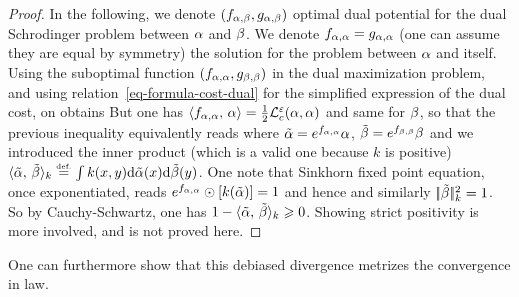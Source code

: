 \begin{proof}	
	In the following, we denote $(f_{\alpha,\beta},g_{\alpha,\beta})$ optimal dual potential for the 
	dual Schrodinger problem between $\alpha$ and $\beta$.
	We denote $f_{\alpha,\alpha}=g_{\alpha,\alpha}$ (one can assume they are equal by symmetry) the solution for the problem between $\alpha$ and itself. 
	Using the suboptimal function $(f_{\alpha,\alpha},g_{\beta,\beta})$ in the dual maximization problem, and using relation~\eqref{eq-formula-cost-dual} for the simplified expression of the dual cost, on obtains
	But one has $\langle f_{\alpha,\alpha},\,\alpha\rangle = \frac{1}{2}\mathcal{L}_c^\varepsilon(\alpha,\alpha)$ and same for $\beta$, so that the previous inequality equivalently reads
	where $\tilde{\alpha}=e^{f_{\alpha,\alpha}} \alpha$, $\tilde{\beta}=e^{f_{\beta,\beta}} \beta$
	and we introduced the inner product (which is a valid one because $k$ is positive) 
	$\langle \tilde{\alpha},\,\tilde{\beta}\rangle_{k} \stackrel{\mbox{\upshape\tiny def.}}{=} \int k(x,y) \mathrm{d}\tilde{\alpha}(x) \mathrm{d}\tilde{\beta}(y)$.
	One note that Sinkhorn fixed point equation, once exponentiated, reads
	$e^{f_{\alpha,\alpha}} \odot [ k( \tilde {\alpha} ) ] = 1$ and hence
	and similarly $|\!| \tilde {\beta} |\!|_k^2=1$. So by Cauchy-Schwartz, one has
	$1 - \langle \tilde{\alpha},\,\tilde{\beta}\rangle_{k} \geqslant 0$.
	Showing strict positivity is more involved, and is not proved here. 
\end{proof}

One can furthermore show that this debiased divergence metrizes the convergence in law. 
      

   
   
